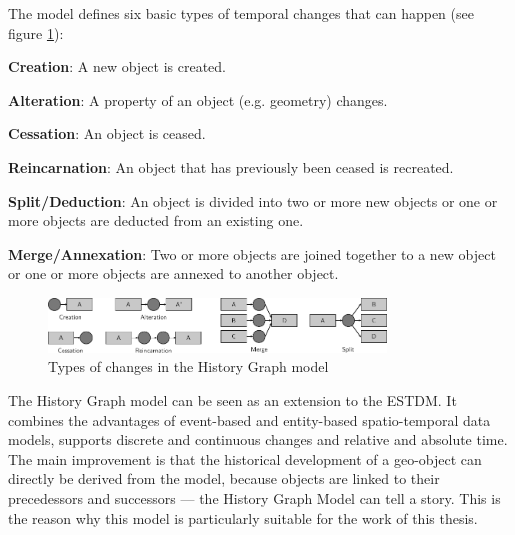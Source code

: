 The model defines six basic types of temporal changes that can happen (see figure \ref{fig:history_graph_changes}):
\begin{compactitem}
  \item \textbf{Creation}:           A new object is created.
  \item \textbf{Alteration}:         A property of an object (e.g. geometry) changes.
  \item \textbf{Cessation}:          An object is ceased.
  \item \textbf{Reincarnation}:      An object that has previously been ceased is recreated.
  \item \textbf{Split/Deduction}:    An object is divided into two or more new objects or one or more objects are deducted from an existing one.
  \item \textbf{Merge/Annexation}:   Two or more objects are joined together to a new object or one or more objects are annexed to another object.
\end{compactitem}

\begin{figure}[ht]
  \centering
  \includegraphics[width=0.8\textwidth]{graphics/basics/stdm/history_graph_changes}
  \caption{Types of changes in the History Graph model}
  \label{fig:history_graph_changes}
\end{figure}

The History Graph model can be seen as an extension to the ESTDM. It combines the advantages of event-based and entity-based spatio-temporal data models, supports discrete and continuous changes and relative and absolute time. The main improvement is that the historical development of a geo-object can directly be derived from the model, because objects are linked to their precedessors and successors --- the History Graph Model can tell a story. This is the reason why this model is particularly suitable for the work of this thesis.



